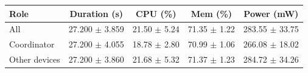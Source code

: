 \begin{tabular}{lcccc}
\hline
\textbf{Role} & \textbf{Duration (s)} & \textbf{CPU (\%)} & \textbf{Mem (\%)} & \textbf{Power (mW)} \\
\hline
All & 27.200 $\pm$ 3.859 & 21.50 $\pm$ 5.24 & 71.35 $\pm$ 1.22 & 283.55 $\pm$ 33.75 \\
Coordinator & 27.200 $\pm$ 4.055 & 18.78 $\pm$ 2.80 & 70.99 $\pm$ 1.06 & 266.08 $\pm$ 18.02 \\
Other devices & 27.200 $\pm$ 3.860 & 21.68 $\pm$ 5.32 & 71.37 $\pm$ 1.23 & 284.72 $\pm$ 34.26 \\
\hline
\end{tabular}
